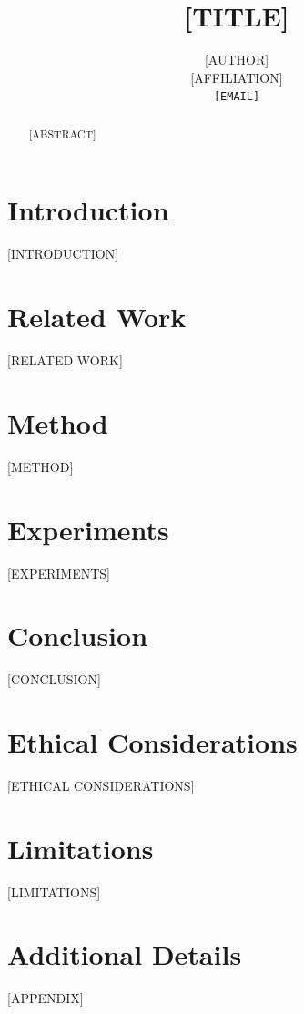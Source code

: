 \documentclass[11pt]{article}
\title{[TITLE]}
\author{[AUTHOR] \\[1ex]
  [AFFILIATION] \\
  \texttt{[EMAIL]}
}
\theoremstyle{plain}
\theoremstyle{definition}
\theoremstyle{remark}
\begin{document}
\maketitle

\begin{abstract}
[ABSTRACT]
\end{abstract}

\section{Introduction}
\label{sec:intro}
[INTRODUCTION]

\section{Related Work}
\label{sec:related}
[RELATED WORK]

\section{Method}
\label{sec:method}
[METHOD]

\section{Experiments}
\label{sec:experiments}
[EXPERIMENTS]

\section{Conclusion}
\label{sec:conclusion}
[CONCLUSION]

\section*{Ethical Considerations}
[ETHICAL CONSIDERATIONS]

\section*{Limitations}
[LIMITATIONS]




\appendix
\section{Additional Details}
[APPENDIX]
\end{document}
